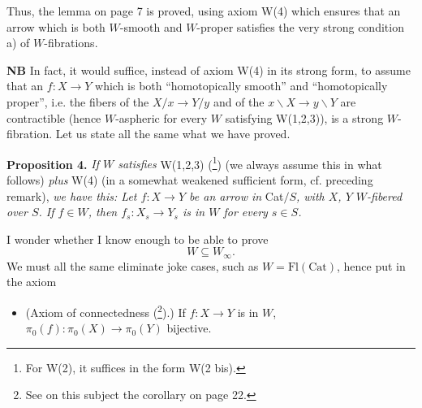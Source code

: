 
Thus, the lemma on page 7 is proved, using axiom W(4) which ensures that an arrow which is both $W$-smooth and $W$-proper satisfies the very strong condition a) of $W$-fibrations.

\textbf{NB} In fact, it would suffice, instead of axiom W(4) in its strong form, to assume that an $f : X \longrightarrow Y$ which is both ``homotopically smooth'' and ``homotopically proper'', i.e. the fibers of the $X/x \longrightarrow Y/y$ and of the $x\backslash X \longrightarrow y\backslash Y$ are contractible (hence $W$-aspheric for every $W$ satisfying W(1,2,3)), is a strong $W$-fibration. Let us state all the same what we have proved.

\textbf{Proposition 4.} \textit{If $W$ satisfies} W(1,2,3) (\footnote[17]{For W(2), it suffices in the form W(2 bis).}) (we always assume this in what follows) \textit{plus} W(4) (in a somewhat weakened sufficient form, cf. preceding remark), \textit{we have this: Let $f : X \longrightarrow Y$ be an arrow in} Cat$/S$\textit{, with $X$, $Y$ $W$-fibered over $S$. If $f \in W$, then $f_s : X_s \longrightarrow Y_s$ is in $W$ for every $s \in S$.}

I wonder whether I know enough to be able to prove
\[ W \subseteq W_\infty . \]
We must all the same eliminate joke cases, such as $W = \mathrm{Fl}(\mathrm{Cat})$, hence put in the axiom

\begin{itemize}[leftmargin=4em, labelwidth=3em, labelsep=0.6em]
\item[W(5)] (Axiom of connectedness (\footnote[18]{See on this subject the corollary on page 22.}).) If $f : X \longrightarrow Y$ is in $W$, $\pi_0(f) : \pi_0(X) \longrightarrow \pi_0(Y)$ bijective.
\end{itemize}

